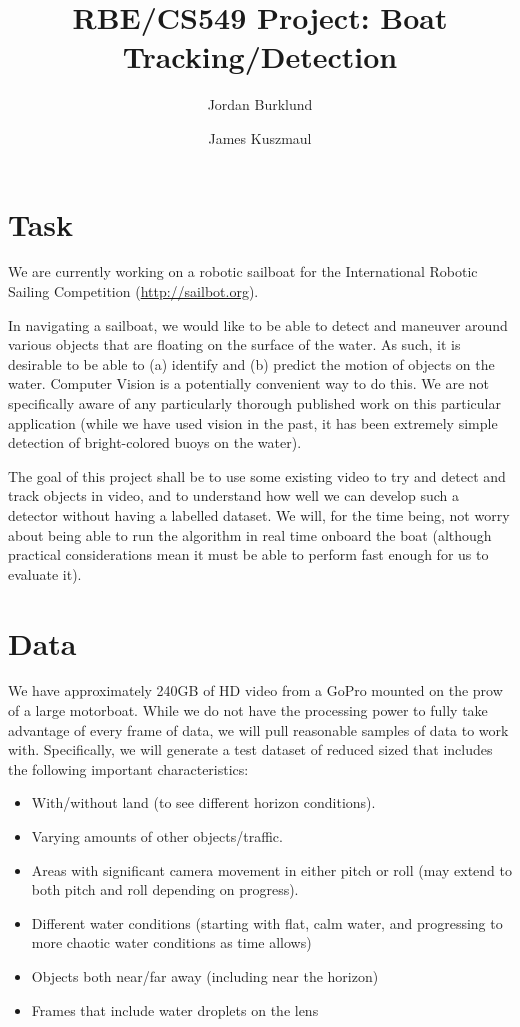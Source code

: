 \documentclass{article}
\title{RBE/CS549 Project: Boat Tracking/Detection}
\author{Jordan Burklund \and James Kuszmaul}
\begin{document}
\maketitle

\tableofcontents

\section{Task}

We are currently working on a robotic sailboat for the
International Robotic Sailing Competition (\url{http://sailbot.org}).

In navigating a sailboat, we would like to be able to
detect and maneuver around various objects
that are floating on the surface of the water. As such,
it is desirable to be able to (a) identify and (b)
predict the motion of objects on the water. Computer
Vision is a potentially convenient way to do this.
We are not specifically aware of any particularly
thorough published work on this particular application
(while we have used vision in the past, it has been
extremely simple detection of bright-colored buoys
on the water).

The goal of this project shall be to use some existing
video to try and detect and track objects in video,
and to understand how well we can develop such a
detector without having a labelled dataset. We will,
for the time being, not worry about being able to run
the algorithm in real time onboard the boat (although
practical considerations mean it must be able to
perform fast enough for us to evaluate it).

\section{Data}

We have approximately 240GB of HD video from a GoPro
mounted on the prow of a large motorboat. While we
do not have the processing power to fully take advantage
of every frame of data, we will pull reasonable samples
of data to work with.  Specifically, we will generate a test dataset of reduced sized that includes the following important characteristics:

\begin{itemize}
\item With/without land (to see different horizon conditions).
\item Varying amounts of other objects/traffic.
\item Areas with significant camera movement in either pitch or roll (may extend to both pitch and roll depending on progress).
\item Different water conditions (starting with flat, calm water, and progressing to more chaotic water conditions as time allows)
\item Objects both near/far away (including near the horizon)
\item Frames that include water droplets on the lens
\end{itemize}
\end{document}
